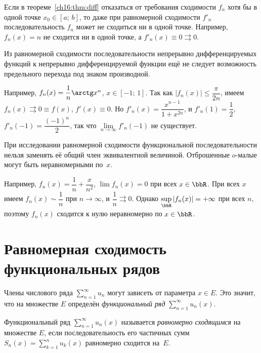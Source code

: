 \begin{notion}
Если в теореме~\ref{ch16:thm:diff} отказаться от требования сходимости $f_n$ хотя бы в одной точке $x_0 \in [a;\, b]$, то даже при равномерной сходимости $f'_n$ последовательность $f_n$ может не сходиться ни в одной точке. Например, $f_n(x) = n$ не сходится ни в одной точке, а $f'_n(x) \equiv 0 \rightrightarrows 0$.
\end{notion}

\begin{notion}
Из равномерной сходимости последовательности непрерывно дифференцируемых функций к непрерывно дифференцируемой функции ещё не следует возможность предельного перехода под знаком производной.

Например, $f_n(x) = \dfrac{1}{n}\arctg x^n$, $x \in [-1;\, 1]$. Так как $|f_n(x)| \le \dfrac{\pi}{2n}$, имеем $f_n(x) \rightrightarrows 0 \equiv f(x)$, $f'(x) \equiv 0$. Но $f'_n(x) = \dfrac{x^{n-1}}{1 + x^{2n}}$, и $f'_n(1) = \dfrac{1}{2}$, $f'_n(-1) = \dfrac{(-1)^n}{2}$, так что $\lim\limits_{n \to \infty} f'_n(-1)$ не существует.
\end{notion}

\begin{notion}[Предостережение]
При исследовании равномерной сходимости функциональной последовательности нельзя заменять её общий член эквивалентной величиной. Отброшенные $o$-малые могут быть неравномерными по~$x$.

Например, $f_n(x) = \dfrac{1}{n} + \dfrac{x}{n^2}$, $\lim f_n(x) = 0$ при всех $x \in \bbR$. При всех $x$ имеем $f_n(x) \sim \dfrac{1}{n}$ при $n \to \infty$, и $\dfrac{1}{n} \rightrightarrows 0$. Однако $\sup\limits_{\bbR} |f_n(x)| = +\infty$ при всех $n$, поэтому $f_n(x)$ сходится к нулю неравномерно по $x \in \bbR$.
\end{notion}

\section{Равномерная сходимость функциональных рядов}

Члены числового ряда $\sum\limits_{n=1}^{\infty} u_n$ могут зависеть от параметра $x \in E$. Это значит, что на множестве $E$ определён \textit{функциональный ряд} $\sum\limits_{n=1}^{\infty} u_n(x)$.

\begin{defn}
Функциональный ряд $\sum\limits_{n=1}^{\infty} u_n(x)$ называется \textit{равномерно сходящимся} на множестве $E$, если последовательность его частичных сумм $S_n(x) = \sum\limits_{k=1}^{n} u_k(x)$ равномерно сходится на~$E$.
\end{defn}

